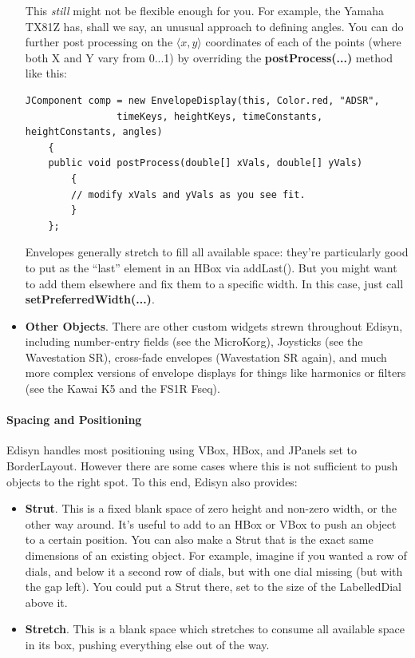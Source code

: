 \documentclass{article}
\begin{document}
\begin{itemize}
This {\it still} might not be flexible enough for you.  For example, the Yamaha TX81Z has, shall we say, an unusual approach to defining angles.  You can do further post processing on the \(\langle x,y\rangle\) coordinates of each of the points (where  both X and Y vary from 0...1) by overriding the {\bf postProcess(...)} method like this:

\begin{verbatim}
JComponent comp = new EnvelopeDisplay(this, Color.red, "ADSR", 
                timeKeys, heightKeys, timeConstants, heightConstants, angles)
    {
    public void postProcess(double[] xVals, double[] yVals)
        {
        // modify xVals and yVals as you see fit.
        }
    };
\end{verbatim}

Envelopes generally stretch to fill all available space: they're particularly good to put as the ``last'' element in an HBox via addLast().  But you might want to add them elsewhere and fix them to a specific width. In this case, just call {\bf setPreferredWidth(...)}.

\item {\bf Other Objects}.  There are other custom widgets strewn throughout Edisyn, including number-entry fields (see the MicroKorg), Joysticks (see the Wavestation SR), cross-fade envelopes (Wavestation SR again), and much more complex versions of envelope displays for things like harmonics or filters (see the Kawai K5 and the FS1R Fseq).  

\end{itemize}

\paragraph{Spacing and Positioning}

Edisyn handles most positioning using VBox, HBox, and JPanels set to BorderLayout.  However there are some cases where this is not sufficient to push objects to the right spot.  To this end, Edisyn also provides:

\begin{itemize}
\item {\bf Strut}.  This is a fixed blank space of zero height and non-zero width, or the other way around.  It's useful to add to an HBox or VBox to push an object to a certain position.  You can also make a Strut that is the exact same dimensions of an existing object.  For example, imagine if you wanted a row of dials, and below it a second row of dials, but with one dial missing (but with the gap left).  You could put a Strut there, set to the size of the LabelledDial above it.

\item {\bf Stretch}.  This is a blank space which stretches to consume all available space in its box, pushing everything else out of the way.
\end{itemize}
\end{document}
